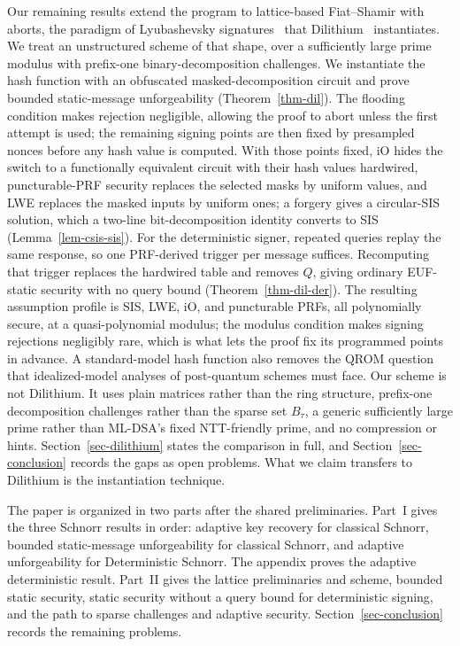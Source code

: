  Our remaining results extend the program to lattice-based Fiat--Shamir with aborts, the paradigm of Lyubashevsky signatures~\cite{AC:Lyubashevsky09,EC:Lyubashevsky12} that Dilithium~\cite{Dilithium} instantiates. We treat an unstructured scheme of that shape, over a sufficiently large prime modulus with prefix-one binary-decomposition challenges. We instantiate the hash function with an obfuscated masked-decomposition circuit and prove bounded static-message unforgeability (Theorem~\ref{thm-dil}). The flooding condition makes rejection negligible, allowing the proof to abort unless the first attempt is used; the remaining signing points are then fixed by presampled nonces before any hash value is computed. With those points fixed, iO hides the switch to a functionally equivalent circuit with their hash values hardwired, puncturable-PRF security replaces the selected masks by uniform values, and LWE replaces the masked inputs by uniform ones; a forgery gives a circular-SIS solution, which a two-line bit-decomposition identity converts to SIS (Lemma~\ref{lem-csis-sis}). For the deterministic signer, repeated queries replay the same response, so one PRF-derived trigger per message suffices. Recomputing that trigger replaces the hardwired table and removes $Q$, giving ordinary EUF-static security with no query bound (Theorem~\ref{thm-dil-der}). The resulting assumption profile is SIS, LWE, iO, and puncturable PRFs, all polynomially secure, at a quasi-polynomial modulus; the modulus condition makes signing rejections negligibly rare, which is what lets the proof fix its programmed points in advance. A standard-model hash function also removes the QROM question that idealized-model analyses of post-quantum schemes must face. Our scheme is not Dilithium. It uses plain matrices rather than the ring structure, prefix-one decomposition challenges rather than the sparse set $B_\tau$, a generic sufficiently large prime rather than ML-DSA's fixed NTT-friendly prime, and no compression or hints. Section~\ref{sec-dilithium} states the comparison in full, and Section~\ref{sec-conclusion} records the gaps as open problems. What we claim transfers to Dilithium is the instantiation technique.

The paper is organized in two parts after the shared preliminaries. Part~I gives the three Schnorr results in order: adaptive key recovery for classical Schnorr, bounded static-message unforgeability for classical Schnorr, and adaptive unforgeability for Deterministic Schnorr. The appendix proves the adaptive deterministic result. Part~II gives the lattice preliminaries and scheme, bounded static security, static security without a query bound for deterministic signing, and the path to sparse challenges and adaptive security. Section~\ref{sec-conclusion} records the remaining problems.

